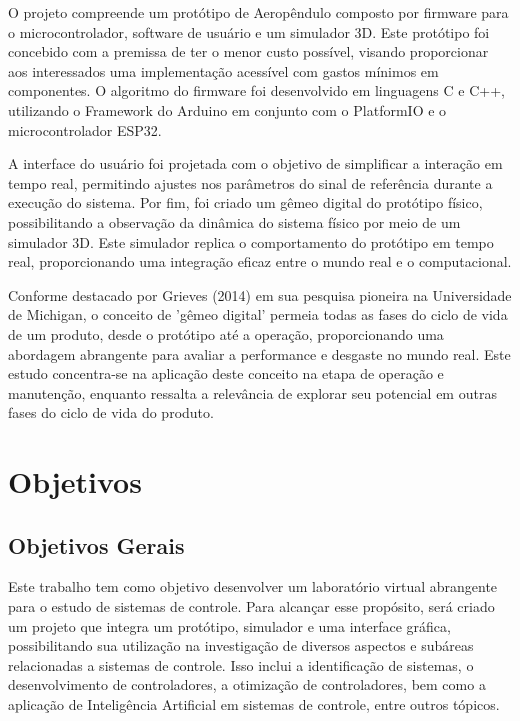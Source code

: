 O projeto compreende um protótipo de Aeropêndulo composto por firmware para o microcontrolador, software de usuário e um simulador 3D. Este protótipo foi concebido com a premissa de ter o menor custo possível, visando proporcionar aos interessados uma implementação acessível com gastos mínimos em componentes. O algoritmo do firmware foi desenvolvido em linguagens C e C++, utilizando o Framework do Arduino em conjunto com o PlatformIO e o microcontrolador ESP32.

A interface do usuário foi projetada com o objetivo de simplificar a interação em tempo real, permitindo ajustes nos parâmetros do sinal de referência durante a execução do sistema. Por fim, foi criado um gêmeo digital do protótipo físico, possibilitando a observação da dinâmica do sistema físico por meio de um simulador 3D. Este simulador replica o comportamento do protótipo em tempo real, proporcionando uma integração eficaz entre o mundo real e o computacional.

Conforme destacado por Grieves (2014) em sua pesquisa pioneira na Universidade de Michigan, o conceito de 'gêmeo digital' permeia todas as fases do ciclo de vida de um produto, desde o protótipo até a operação, proporcionando uma abordagem abrangente para avaliar a performance e desgaste no mundo real. Este estudo concentra-se na aplicação deste conceito na etapa de operação e manutenção, enquanto ressalta a relevância de explorar seu potencial em outras fases do ciclo de vida do produto\cite{quinalha2018gemeos}.


\section{Objetivos}

\subsection{Objetivos Gerais}

Este trabalho tem como objetivo desenvolver um laboratório virtual abrangente para o estudo de sistemas de controle. Para alcançar esse propósito, será criado um projeto que integra um protótipo, simulador e uma interface gráfica, possibilitando sua utilização na investigação de diversos aspectos e subáreas relacionadas a sistemas de controle. Isso inclui a identificação de sistemas, o desenvolvimento de controladores, a otimização de controladores, bem como a aplicação de Inteligência Artificial em sistemas de controle, entre outros tópicos.

